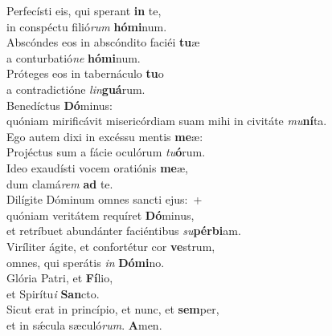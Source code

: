 \evenverse Perfecísti eis, qui sperant \textbf{in} te,~\*\\
\evenverse in conspéctu filió\textit{rum} \textbf{hó}\textbf{mi}num.\\
\oddverse Abscóndes eos in abscóndito faciéi \textbf{tu}æ~\*\\
\oddverse a conturbatió\textit{ne} \textbf{hó}\textbf{mi}num.\\
\evenverse Próteges eos in tabernáculo \textbf{tu}o~\*\\
\evenverse a contradictióne \textit{lin}\textbf{guá}rum.\\
\oddverse Benedíctus \textbf{Dó}minus:~\*\\
\oddverse quóniam mirificávit misericórdiam suam mihi in civitáte \textit{mu}\textbf{ní}ta.\\
\evenverse Ego autem dixi in excéssu mentis \textbf{me}æ:~\*\\
\evenverse Projéctus sum a fácie oculórum \textit{tu}\textbf{ó}rum.\\
\oddverse Ideo exaudísti vocem oratiónis \textbf{me}æ,~\*\\
\oddverse dum clamá\textit{rem} \textbf{ad} te.\\
\evenverse Dilígite Dóminum omnes sancti ejus:~+\\
\evenverse  quóniam veritátem requíret \textbf{Dó}minus,~\*\\
\evenverse et retríbuet abundánter faciéntibus \textit{su}\textbf{pér}\textbf{bi}am.\\
\oddverse Viríliter ágite, et confortétur cor \textbf{ve}strum,~\*\\
\oddverse omnes, qui sperátis \textit{in} \textbf{Dó}\textbf{mi}no.\\
\evenverse Glória Patri, et \textbf{Fí}lio,~\*\\
\evenverse et Spirítu\textit{i} \textbf{San}cto.\\
\oddverse Sicut erat in princípio, et nunc, et \textbf{sem}per,~\*\\
\oddverse et in sǽcula sæculó\textit{rum}. \textbf{A}men.\\
